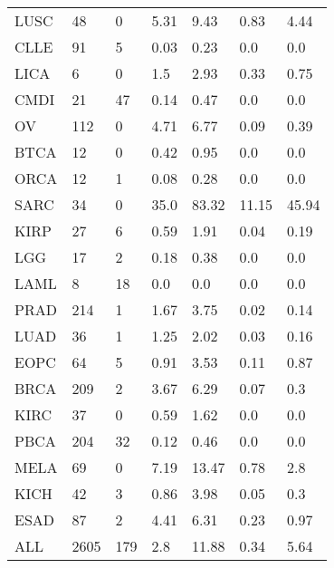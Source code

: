 \documentclass[a4paper,10pt]{article}
\begin{document}
\begin{table}[]
\begin{tabular}{l|l|l|l|l|l|l}
LUSC&48&0&5.31&9.43&0.83&4.44\\
CLLE&91&5&0.03&0.23&0.0&0.0\\
LICA&6&0&1.5&2.93&0.33&0.75\\
CMDI&21&47&0.14&0.47&0.0&0.0\\
OV&112&0&4.71&6.77&0.09&0.39\\
BTCA&12&0&0.42&0.95&0.0&0.0\\
ORCA&12&1&0.08&0.28&0.0&0.0\\
SARC&34&0&35.0&83.32&11.15&45.94\\
KIRP&27&6&0.59&1.91&0.04&0.19\\
LGG&17&2&0.18&0.38&0.0&0.0\\
LAML&8&18&0.0&0.0&0.0&0.0\\
PRAD&214&1&1.67&3.75&0.02&0.14\\
LUAD&36&1&1.25&2.02&0.03&0.16\\
EOPC&64&5&0.91&3.53&0.11&0.87\\
BRCA&209&2&3.67&6.29&0.07&0.3\\
KIRC&37&0&0.59&1.62&0.0&0.0\\
PBCA&204&32&0.12&0.46&0.0&0.0\\
MELA&69&0&7.19&13.47&0.78&2.8\\
KICH&42&3&0.86&3.98&0.05&0.3\\
ESAD&87&2&4.41&6.31&0.23&0.97\\
\hline
ALL&2605&179&2.8&11.88&0.34&5.64\\
\end{tabular}
\end{table}
\end{document}
